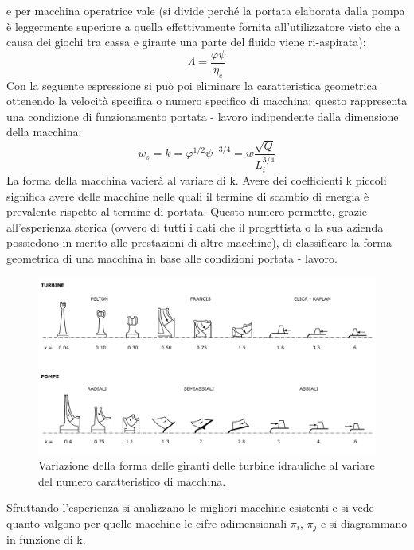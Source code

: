e per macchina operatrice vale (si divide perché la portata elaborata dalla pompa è leggermente superiore a quella effettivamente fornita all'utilizzatore visto che a causa dei giochi tra cassa e girante una parte del fluido viene ri-aspirata):
\begin{equation}
\Lambda = \frac{\varphi \psi}{\eta_e}
\end{equation}
Con la seguente espressione si può poi eliminare la caratteristica geometrica ottenendo la velocità specifica o numero specifico di macchina; questo rappresenta una condizione di funzionamento portata - lavoro indipendente dalla dimensione della macchina:
\begin{equation}
w_s = k = \varphi^{1/2} \psi^{-3/4} = w \frac{\sqrt{Q}}{L_i^{3/4}}
\end{equation}
La forma della macchina varierà al variare di k. Avere dei coefficienti k piccoli significa avere delle macchine nelle quali il termine di scambio di energia è prevalente rispetto al termine di portata. Questo numero permette, grazie all'esperienza storica (ovvero di tutti i dati che il progettista o la sua azienda possiedono in merito alle prestazioni di altre macchine), di classificare la forma geometrica di una macchina in base alle condizioni portata - lavoro.
\begin{figure}[h!]
\centering
  \includegraphics[width=\textwidth]{fig/numcar.pdf}
\caption{Variazione della forma delle giranti delle turbine idrauliche al variare del numero caratteristico di macchina.}
\label{fig:numcar}
\end{figure}
Sfruttando l'esperienza si analizzano le migliori macchine esistenti e si vede quanto valgono per quelle macchine le cifre adimensionali $\pi_i$, $\pi_j$ e si diagrammano in funzione di k.

